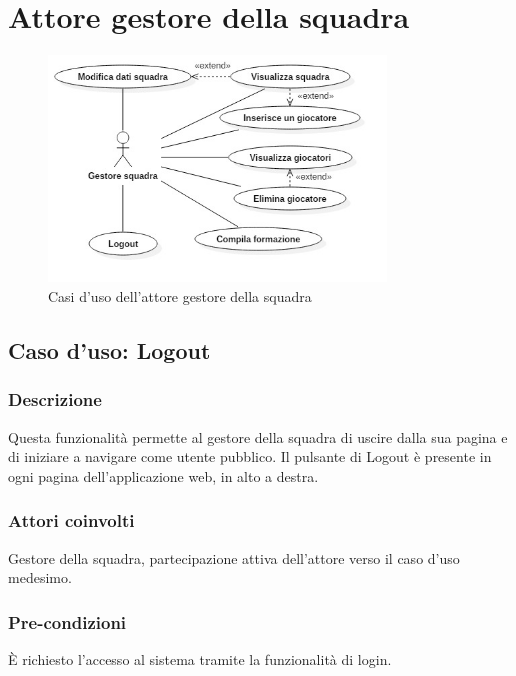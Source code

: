 
\clearpage

\section{Attore gestore della squadra}
%
%
\begin{figure}[h]
	\centering
	\includegraphics[width=0.8\textwidth]
	{immagini/uc-gestore-squadra}
	
	\caption{Casi d'uso dell'attore gestore della squadra}
\end{figure}


%
%
\subsection{Caso d'uso: Logout}

\subsubsection*{Descrizione}
Questa funzionalità permette al gestore della squadra di uscire dalla sua pagina e di iniziare a navigare come utente pubblico.
Il pulsante di Logout è presente in ogni pagina dell'applicazione web, in alto a destra.

\subsubsection*{Attori coinvolti}
Gestore della squadra, partecipazione attiva dell'attore verso il caso d'uso medesimo.

\subsubsection*{Pre-condizioni}
È richiesto l'accesso al sistema tramite la funzionalità di login.

